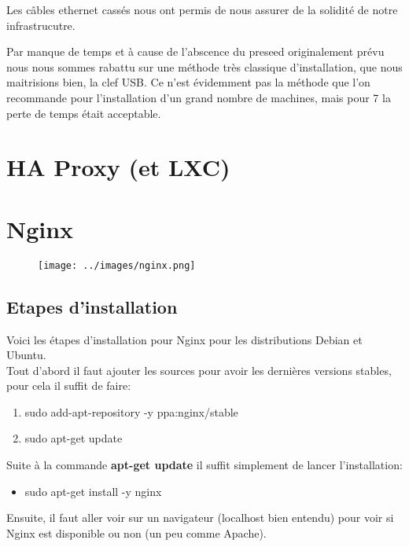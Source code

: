 \documentclass[a4paper,10pt,one side,titlepage]{report}
\begin{document}
Les câbles ethernet cassés nous ont permis de nous assurer de la solidité de notre 
infrastrucutre. 

Par manque de temps et à cause de l'abscence du preseed originalement prévu nous 
nous sommes rabattu sur une méthode très classique d'installation, que nous 
maitrisions bien, la clef USB. Ce n'est évidemment pas la méthode que l'on recommande
pour l'installation d'un grand nombre de machines, mais pour 7 la perte de temps 
était acceptable.

\section{HA Proxy (et LXC)}


\newpage
\section{Nginx}
\begin{figure}[H]
    \centering
\texttt{[image: ../images/nginx.png]} 
    \label{fig:nginxintro}
\end{figure}

\subsection{Etapes d'installation}
Voici les étapes d'installation pour Nginx pour les distributions Debian et Ubuntu.\\
Tout d'abord il faut ajouter les sources pour avoir les dernières versions stables, pour cela il suffit de faire:
\begin{enumerate}
\item sudo add-apt-repository -y ppa:nginx/stable
\item sudo apt-get update
\end{enumerate}
Suite à la commande \textbf{apt-get update} il suffit simplement de lancer l'installation:
\begin{itemize}
\item sudo apt-get install -y nginx
\end{itemize}
Ensuite, il faut aller voir sur un navigateur (localhost bien entendu) pour voir si Nginx est disponible ou non (un peu comme Apache).
\end{document}
